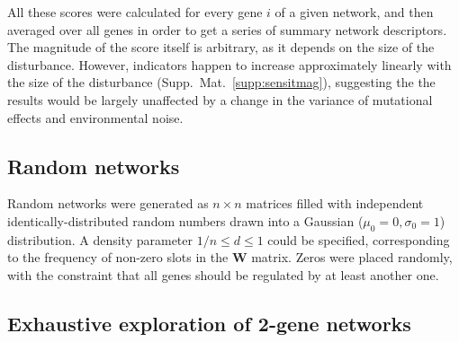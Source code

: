 \documentclass[10pt,a4paper]{article}
\begin{document}
All these scores were calculated for every gene $i$ of a given network, and then averaged over all genes in order to get a series of summary network descriptors. The magnitude of the score itself is arbitrary, as it depends on the size of the disturbance. However, indicators happen to increase approximately linearly with the size of the disturbance (Supp.\ Mat.\ \ref{supp:sensitmag}), suggesting the the results would be largely unaffected by a change in the variance of mutational effects and environmental noise. 

\subsection{Random networks}

Random networks were generated as $n\times n$ matrices filled with independent identically-distributed random numbers drawn into a Gaussian ($\mu_0 = 0, \sigma_0 = 1$) distribution.  A density parameter $1/n \leq d \leq 1$ could be specified, corresponding to the frequency of non-zero slots in the $\bm W$ matrix. Zeros were placed randomly, with the constraint that all genes should be regulated by at least another one. 

\subsection{Exhaustive exploration of 2-gene networks}
\end{document}
